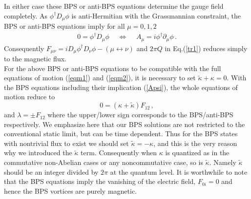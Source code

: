 \documentclass[a4paper,12pt]{article}
\def\const{{\tilde{\kappa}}}
\begin{document}
In either case these BPS or anti-BPS equations determine the gauge field completely.  As  $\phi^{\dagger}D_{\mu}\phi$ is anti-Hermitian  with the
Grassmannian constraint, the BPS or anti-BPS equations imply for all $\mu=0,1,2$
\begin{equation}
\begin{array}{ccc}
0=\phi^{\dagger}D_{\mu}\phi~~~&\Longleftrightarrow&~~~A_{\mu}=i\phi^{\dagger}\partial_{\mu}\phi\,.
\end{array}
\label{Apsi}
\end{equation}
Consequently  $F_{\mu\nu}=iD_{\mu}\phi^{\dagger}D_{\nu}\phi-(\mu\leftrightarrow\nu)$ and $2\pi Q$  in
Eq.(\ref{tr1}) reduces simply to the magnetic flux. \\


For the above BPS or anti-BPS equations to be compatible with the full equations of motion (\ref{eqm1}) and
(\ref{eqm2}),   it is necessary to set $\const+\kappa=0$. With the BPS equations including their implication
(\ref{Apsi}),  the whole equations of motion  reduce  to
\begin{equation}
0=(\kappa+\const)F_{12}\,,
\label{redeqm}
\end{equation}
and $\lambda=\pm F_{12}$ where the upper/lower sign corresponds to the BPS/anti-BPS respectively. We emphasize here that
our BPS solutions are not restricted to the conventional static limit, but can be time dependent. Thus for the BPS states
with nontrivial flux to exist we should set $\const=-\kappa$, and this is the very reason why we introduced the
$\tilde{\kappa}$ term.  Consequently when $\kappa$ is quantized as in the commutative non-Abelian cases or any
noncommutative case, so is  $\const$.  Namely  $\const$  should be an integer divided by $2\pi$   at the quantum level.
It is worthwhile to note that the BPS equations imply the vanishing of the electric field,  $F_{0i}=0$ and hence the BPS
vortices  are purely magnetic. \newline

\end{document}
